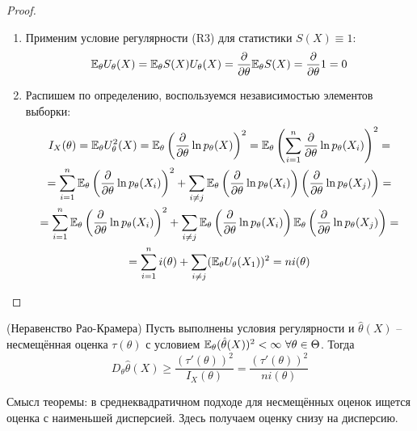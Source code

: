 \begin{proof}~
    \begin{enumerate}
        \item Применим условие регулярности (R3) для статистики $S(X) \equiv 1$:
        \[
            \mathbb{E}_\theta U_\theta(X) = \mathbb{E}_\theta S(X) U_\theta(X) = \frac{\partial}{\partial \theta} \mathbb{E}_\theta S(X) = \frac{\partial}{\partial \theta} 1 = 0 
        \]

        \item Распишем по определению, воспользуемся независимостью элементов выборки:
        \begin{multline*}
            I_X(\theta) = \mathbb{E}_\theta U_\theta^2(X) = \mathbb{E}_\theta \left(\frac{\partial}{\partial \theta} \ln p_\theta(X)\right)^2 = \mathbb{E}_\theta \left(\sum_{i=1}^n \frac{\partial}{\partial \theta} \ln p_\theta(X_i)\right)^2 =
            \\
            = \sum_{i=1}^n \mathbb{E}_\theta \left(\frac{\partial}{\partial \theta} \ln p_\theta(X_i)\right)^2 + \sum_{i \neq j} \mathbb{E}_\theta \left(\frac{\partial}{\partial \theta} \ln p_\theta(X_i)\right) \left(\frac{\partial}{\partial \theta} \ln p_\theta(X_j)\right) =
            \\
            = \sum_{i=1}^n \mathbb{E}_\theta \left(\frac{\partial}{\partial \theta} \ln p_\theta(X_i)\right)^2 + \sum_{i \neq j} \mathbb{E}_\theta \left(\frac{\partial}{\partial \theta} \ln p_\theta(X_i)\right) \mathbb{E}_\theta \left(\frac{\partial}{\partial \theta} \ln p_\theta(X_j)\right) =
            \\
            = \sum_{i=1}^n i(\theta) + \sum_{i \neq j} (\mathbb{E}_\theta U_\theta(X_1))^2 = n i(\theta)
        \end{multline*}
    \end{enumerate}
\end{proof}

\begin{theorem} (Неравенство Рао-Крамера)
    Пусть выполнены условия регулярности и $\hat{\theta}(X)$ -- несмещённая оценка $\tau(\theta)$ с условием $\mathbb{E}_\theta (\hat{\theta}(X))^2 < \infty \ \forall \theta \in \Theta$. Тогда
    \[
        D_\theta \hat{\theta}(X) \ge \frac{(\tau'(\theta))^2}{I_X(\theta)} = \frac{(\tau'(\theta))^2}{n i(\theta)}
    \]
\end{theorem}

\begin{note}
    Смысл теоремы: в среднеквадратичном подходе для несмещённых оценок ищется оценка с наименьшей дисперсией. Здесь получаем оценку снизу на дисперсию.
\end{note}


